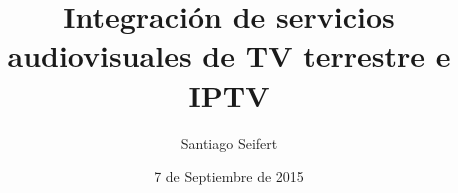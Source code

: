 \documentclass[a4paper,11pt]{beamer}
\title[ISDB-Tb Extendido]{Integración de servicios audiovisuales de TV terrestre e IPTV} %
\author{Santiago Seifert} %
\institute[UNLP] %
{
Universidad Nacional de La Plata \\ %
\medskip
\textit{santiagoseifert@gmail.com} %
}
\date{7 de Septiembre de 2015}
\begin{document}
\begin{frame}
\titlepage %
\end{frame}








\end{document}
